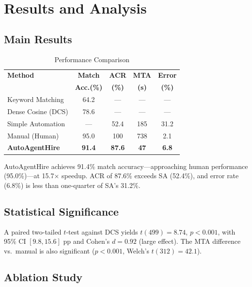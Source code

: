\documentclass[conference]{IEEEtran}
\begin{document}
\section{Results and Analysis}

\subsection{Main Results}

\begin{table}[htbp]
\caption{Performance Comparison}
\label{tab:main_results}
\centering
\begin{tabular}{@{}l c c c c@{}}
\toprule
\textbf{Method} & \textbf{Match} & \textbf{ACR} & \textbf{MTA} & \textbf{Error} \\
 & \textbf{Acc.(\%)} & \textbf{(\%)} & \textbf{(s)} & \textbf{(\%)} \\
\midrule
Keyword Matching      & 64.2 & ---   & ---   & --- \\
Dense Cosine (DCS)    & 78.6 & ---   & ---   & --- \\
Simple Automation     & ---  & 52.4  & 185   & 31.2 \\
Manual (Human)        & 95.0 & 100   & 738   & 2.1 \\
\midrule
\textbf{AutoAgentHire}       & \textbf{91.4} & \textbf{87.6} & \textbf{47} & \textbf{6.8} \\
\bottomrule
\end{tabular}
\end{table}

AutoAgentHire achieves 91.4\% match accuracy---approaching human performance (95.0\%)---at 15.7$\times$ speedup. ACR of 87.6\% exceeds SA (52.4\%), and error rate (6.8\%) is less than one-quarter of SA's 31.2\%.

\subsection{Statistical Significance}
A paired two-tailed $t$-test against DCS yields $t(499) = 8.74$, $p < 0.001$, with 95\% CI $[9.8, 15.6]$ pp and Cohen's $d = 0.92$ (large effect). The MTA difference vs.\ manual is also significant ($p < 0.001$, Welch's $t(312) = 42.1$).

\subsection{Ablation Study}
\end{document}
